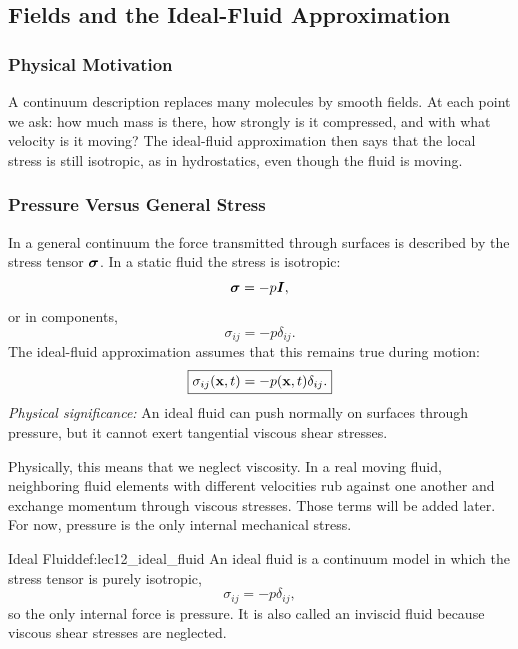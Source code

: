\documentclass[../main.tex]{subfiles}
\begin{document}
\subsection{Fields and the Ideal-Fluid Approximation}\label{sec:lec12:fields-ideal}

\subsubsection*{Physical Motivation}
A continuum description replaces many molecules by smooth fields. At each point we ask: how much mass is there, how strongly is it compressed, and with what velocity is it moving? The ideal-fluid approximation then says that the local stress is still isotropic, as in hydrostatics, even though the fluid is moving.

\subsubsection{Pressure Versus General Stress}\label{subsec:lec12:pressure-stress}
In a general continuum the force transmitted through surfaces is described by the stress tensor $\boldsymbol{\sigma}$. In a static fluid the stress is isotropic:
\begin{equation}
  \boldsymbol{\sigma}=-p\boldsymbol{I},
  \label{eq:lec12_static_fluid_stress}
\end{equation}
or in components,
\begin{equation}
  \sigma_{ij}=-p\delta_{ij}.
  \label{eq:lec12_static_fluid_stress_components}
\end{equation}
The ideal-fluid approximation assumes that this remains true during motion:
\begin{equation}
  \boxed{\sigma_{ij}(\mathbf{x},t)=-p(\mathbf{x},t)\delta_{ij}.}
  \label{eq:lec12_ideal_stress}
\end{equation}
\textit{Physical significance:} An ideal fluid can push normally on surfaces through pressure, but it cannot exert tangential viscous shear stresses.

Physically, this means that we neglect viscosity. In a real moving fluid, neighboring fluid elements with different velocities rub against one another and exchange momentum through viscous stresses. Those terms will be added later. For now, pressure is the only internal mechanical stress.

\begin{Definition}{Ideal Fluid}{def:lec12_ideal_fluid}
An ideal fluid is a continuum model in which the stress tensor is purely isotropic,
\[
  \sigma_{ij}=-p\delta_{ij},
\]
so the only internal force is pressure. It is also called an inviscid fluid because viscous shear stresses are neglected.
\end{Definition}
\end{document}
